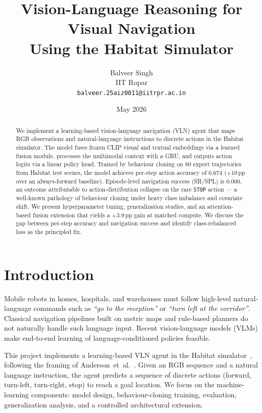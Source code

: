 \documentclass[10pt, twocolumn]{article}
\title{\vspace{-1.5em}\textbf{Vision-Language Reasoning for Visual Navigation\\
       Using the Habitat Simulator}\vspace{-0.5em}}
\author{Balveer Singh\\\small{IIT Ropar} \\\small{\texttt{balveer.25aiz0011@iitrpr.ac.in}}}
\date{\vspace{-0.5em}\small May 2026}
\begin{document}
\twocolumn[\maketitle\vspace{-1em}\begin{center}\rule{0.5\textwidth}{0.4pt}\end{center}\vspace{0.5em}]

\begin{abstract}\small
We implement a learning-based vision-language navigation (VLN) agent that
maps RGB observations and natural-language instructions to discrete actions
in the Habitat simulator. The model fuses frozen CLIP visual and textual
embeddings via a learned fusion module, processes the multimodal context
with a GRU, and outputs action logits via a linear policy head. Trained by
behaviour cloning on 80 expert trajectories from Habitat test scenes, the
model achieves per-step action accuracy of $0.674$ ($+10$\,pp over an
always-forward baseline). Episode-level navigation success (SR/SPL) is
$0.000$, an outcome attributable to action-distribution collapse on the
rare \texttt{STOP} action --- a well-known pathology of behaviour cloning
under heavy class imbalance and covariate shift. We present hyperparameter
tuning, generalization studies, and an attention-based fusion extension
that yields a $+3.9$\,pp gain at matched compute. We discuss the gap
between per-step accuracy and navigation success and identify
class-rebalanced loss as the principled fix.
\end{abstract}

\section{Introduction}

Mobile robots in homes, hospitals, and warehouses must follow high-level
natural-language commands such as \emph{``go to the reception''} or
\emph{``turn left at the corridor''}. Classical navigation pipelines built
on metric maps and rule-based planners do not naturally handle such
language input. Recent vision-language models (VLMs) make end-to-end
learning of language-conditioned policies feasible.

This project implements a learning-based VLN agent in the Habitat
simulator~\cite{savva2019habitat}, following the framing of
Anderson~et~al.~\cite{anderson2018vln}. Given an RGB sequence and a natural
language instruction, the agent predicts a sequence of discrete actions
(forward, turn-left, turn-right, stop) to reach a goal location. We focus
on the machine-learning components: model design, behaviour-cloning
training, evaluation, generalization analysis, and a controlled
architectural extension.
\end{document}
